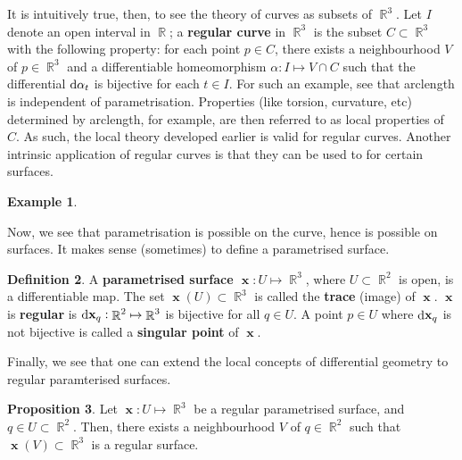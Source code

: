 \documentclass{amsart} %
\theoremstyle{mytheoremstyle}
\theoremstyle{definition}
\newtheorem{definition}{Definition}[section]
\newtheorem{proposition}[definition]{Proposition}
\newtheorem{example}[definition]{Example}
\numberwithin{equation}{section}
\DeclareMathOperator{\R}{\mathbb{R}}
\DeclareMathOperator{\1}{\mathbbm{1}}
\DeclareMathOperator{\D}{\dif}
\DeclareMathOperator{\x}{\mathbf{x}}
\begin{document}
It is intuitively true, then, to see the theory of curves as subsets of $\R^3$. Let $I $ denote an open interval in $\R$; a \textbf{regular curve} in $\R^3$ is the subset $C \subset \R^3$ with the following property: for each point $p \in C$, there exists a neighbourhood $V$ of $p \in \R^3$ and a differentiable homeomorphism $\alpha: I \mapsto V \cap C $ such that the differential $\D \alpha_t $ is bijective for each $t \in I$. For such an example, see that arclength is independent of parametrisation. Properties (like torsion, curvature, etc) determined by arclength, for example, are then referred to as local properties of $C$. As such, the local theory developed earlier is valid for regular curves. Another intrinsic application of regular curves is that they can be used to for certain surfaces.

\begin{example}
	\label{examplesurfacesofrevolution}
\end{example}


Now, we see that parametrisation is possible on the curve, hence is possible on surfaces. It makes sense (sometimes) to define a parametrised surface.

\begin{definition}
	\label{defparametrisedsurfaces}
	A \textbf{parametrised surface $\x : U \mapsto \R^3$}, where $U \subset \R^2$ is open, is a differentiable map. The set $\x(U) \subset \R^3$ is called the \textbf{trace} (image) of $\x$. $\x$ is \textbf{regular} is $\D \x_{q}  : \R^2 \mapsto \R^3$ is bijective for all $q \in U$. A point $p \in U$ where $\D \x_{q} $ is not bijective is called a \textbf{singular point} of $\x$.
\end{definition}

Finally, we see that one can extend the local concepts of differential geometry to regular paramterised surfaces.

\begin{proposition}
	\label{propimageunderregularparametrisedsurfaceisregularsurface}
	Let $\x: U \mapsto \R^3$ be a regular parametrised surface, and $q \in U \subset \R^2$. Then, there exists a neighbourhood $V$ of $q \in \R^2$ such that $\x(V) \subset \R^3$ is a regular surface.
\end{proposition}
\end{document}
